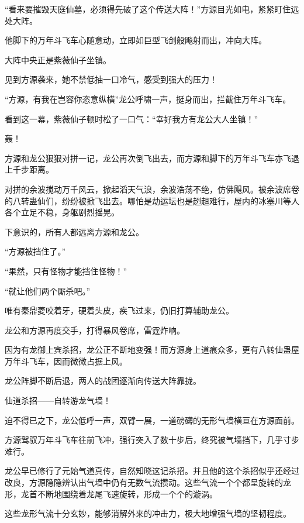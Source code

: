 
\begin{this_body}

“看来要摧毁天庭仙墓，必须得先破了这个传送大阵！”方源目光如电，紧紧盯住远处大阵。

他脚下的万年斗飞车心随意动，立即如巨型飞剑般飚射而出，冲向大阵。

大阵中央正是紫薇仙子坐镇。

见到方源袭来，她不禁低抽一口冷气，感受到强大的压力！

“方源，有我在岂容你恣意纵横”龙公呼啸一声，挺身而出，拦截住万年斗飞车。

看到这一幕，紫薇仙子顿时松了一口气：“幸好我方有龙公大人坐镇！”

轰！

方源和龙公狠狠对拼一记，龙公再次倒飞出去，而方源和脚下的万年斗飞车亦飞退上千步距离。

对拼的余波搅动万千风云，掀起滔天气浪，余波浩荡不绝，仿佛飓风。被余波席卷的八转蛊仙们，纷纷被掀飞出去。哪怕是劫运坛也是趔趄难行，屋内的冰塞川等人各个立足不稳，身躯剧烈摇晃。

下意识的，所有人都远离方源和龙公。

“方源被挡住了。”

“果然，只有怪物才能挡住怪物！”

“就让他们两个厮杀吧。”

唯有秦鼎菱咬着牙，硬着头皮，疾飞过来，仍旧打算辅助龙公。

龙公和方源再度交手，打得暴风卷席，雷霆炸响。

因为有龙御上宾杀招，龙公正不断地变强！而方源身上道痕众多，更有八转仙蛊屋万年斗飞车，因而微微占据上风。

龙公阵脚不断后退，两人的战团逐渐向传送大阵靠拢。

仙道杀招——自转游龙气墙！

迫不得已之下，龙公低呼一声，双臂一展，一道磅礴的无形气墙横亘在方源面前。

方源驾驭万年斗飞车往前飞冲，强行突入了数十步后，终究被气墙挡下，几乎寸步难行。

龙公早已修行了元始气道真传，自然知晓这记杀招。并且他的这个杀招似乎还经过改良，方源隐隐辨认出气墙中仍有无数气流攒动。这些气流一个个都呈旋转的龙形，龙首不断地围绕着龙尾飞速旋转，形成一个个的漩涡。

这些龙形气流十分玄妙，能够消解外来的冲击力，极大地增强气墙的坚韧程度。


\end{this_body}
